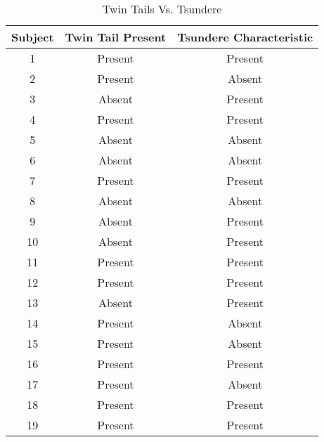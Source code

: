 




\begin{longtable}[H]{@{}ccc@{}}
\caption{Twin Tails Vs. Tsundere}
\label{tab:relationalDataTsun}\\
\toprule
Subject & Twin Tail Present & Tsundere Characteristic \\* \midrule
\endfirsthead
%
\endhead
%
\bottomrule
\endfoot
%
\endlastfoot
%

1       & Present           & Present                 \\
2       & Present           & Absent                  \\
3       & Absent            & Present                 \\
4       & Present           & Present                 \\
5       & Absent            & Absent                  \\
6       & Absent            & Absent                  \\
7       & Present           & Present                 \\
8       & Absent            & Absent                  \\
9       & Absent            & Present                 \\
10      & Absent            & Present                 \\
11      & Present           & Present                 \\
12      & Present           & Present                 \\
13      & Absent            & Present                 \\
14      & Present           & Absent                  \\
15      & Present           & Absent                  \\
16      & Present           & Present                 \\
17      & Present           & Absent                  \\
18      & Present           & Present                 \\
19      & Present           & Present                 \\

\end{longtable}
